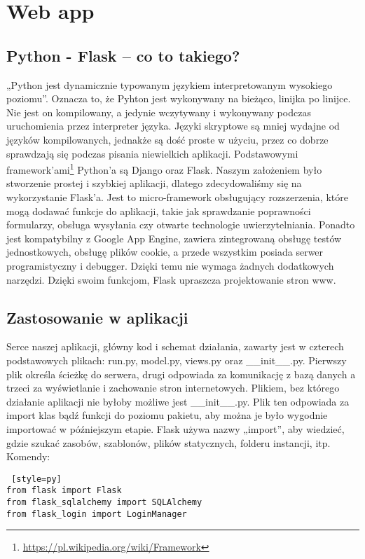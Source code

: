 \documentclass{xmgr}
\begin{document}
\chapter{Web app}

\section{Python - Flask -- co to takiego?}
„Python jest dynamicznie typowanym językiem interpretowanym wysokiego poziomu”\cite{Bednarz:2017:Python}. Oznacza to, że Pyhton jest wykonywany na bieżąco, linijka po linijce. Nie jest on kompilowany, a jedynie wczytywany i wykonywany podczas uruchomienia przez interpreter języka. Języki skryptowe są mniej wydajne od języków kompilowanych, jednakże są dość proste w użyciu, przez co dobrze sprawdzają się podczas pisania niewielkich aplikacji. 
Podstawowymi framework’ami\footnote{\url{https://pl.wikipedia.org/wiki/Framework}} Python’a są Django oraz Flask\cite{Ronacher:2017:Flask}. Naszym założeniem było stworzenie prostej i szybkiej aplikacji, dlatego zdecydowaliśmy się na wykorzystanie Flask’a. Jest to micro-framework obsługujący rozszerzenia, które mogą dodawać funkcje do aplikacji, takie jak sprawdzanie poprawności formularzy, obsługa wysyłania czy otwarte technologie uwierzytelniania. Ponadto jest kompatybilny z Google App Engine, zawiera zintegrowaną obsługę testów jednostkowych, obsługę plików cookie, a przede wszystkim posiada serwer programistyczny i debugger. Dzięki temu nie wymaga żadnych dodatkowych narzędzi. Dzięki swoim funkcjom, Flask upraszcza projektowanie stron www. 

\section{Zastosowanie w aplikacji}
Serce naszej aplikacji, główny kod i schemat działania, zawarty jest w czterech podstawowych plikach: run.py, model.py, views.py oraz \newline\_\_init\_\_.py.  Pierwszy plik określa ścieżkę do serwera, drugi odpowiada za komunikację z bazą danych a trzeci za wyświetlanie i zachowanie stron internetowych. Plikiem, bez którego działanie aplikacji nie byłoby możliwe jest \_\_init\_\_.py. Plik ten odpowiada za import klas bądź funkcji do poziomu pakietu, aby można je było wygodnie importować w późniejszym etapie. Flask używa nazwy „import”, aby wiedzieć, gdzie szukać zasobów, szablonów, plików statycznych, folderu instancji, itp.
Komendy:
\begin{lstlisting} [style=py] 
from flask import Flask
from flask_sqlalchemy import SQLAlchemy
from flask_login import LoginManager
\end{lstlisting}
\end{document}
